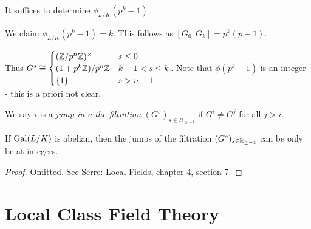 \documentclass[10pt,a4paper]{article}
\begin{document}
It suffices to determine $\phi_{L/K}(p^k-1)$.

We claim $\phi_{L/K}(p^k-1) = k$. This follows as $[G_0:G_k] = p^k(p-1)$.

Thus $G^s \cong \begin{cases} (\mathbb{Z}/p^n\mathbb{Z})^\times & s \leq 0 \\ (1+p^k \mathbb{Z})/p^n\mathbb{Z} & k-1<s\leq k \\ \{1\} & s>n-1\end{cases}$.
Note that $\phi(p^k-1)$ is an integer - this is a priori not clear.

\begin{definition}
  We say $i$ is a \emph{jump in a the filtration} $(G^s)_{s \in R_{\geq-1}}$ if $G^i \neq G^j$ for all $j > i$.
\end{definition}
\begin{theorem}
  If $\operatorname{Gal}(L/K)$ is abelian, then the jumps of the filtration $(G^s)_{s \in \mathbb{R}_{\geq -1}}$ can be only be at integers.
\end{theorem}
\begin{proof}
  Omitted. See Serre: Local Fields, chapter 4, section 7.
\end{proof}

\section{Local Class Field Theory}
\end{document}
